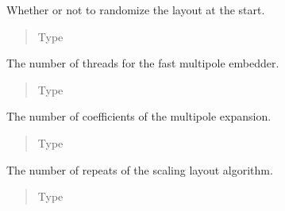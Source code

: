 \documentclass[letterpaper,10pt,english]{sphinxmanual}
\begin{document}
\begin{fulllineitems}
\begin{fulllineitems}
\begin{quote}
\begin{description}
\end{description}\end{quote}

\end{fulllineitems}



\begin{fulllineitems}
Whether or not to randomize the layout at the start.
\begin{quote}\begin{description}
\item[{Type}] \leavevmode
{}

\end{description}\end{quote}

\end{fulllineitems}



\begin{fulllineitems}
The number of threads for the fast multipole embedder.
\begin{quote}\begin{description}
\item[{Type}] \leavevmode
{}

\end{description}\end{quote}

\end{fulllineitems}



\begin{fulllineitems}
The number of coefficients of the multipole expansion.
\begin{quote}\begin{description}
\item[{Type}] \leavevmode
{}

\end{description}\end{quote}

\end{fulllineitems}



\begin{fulllineitems}
The number of repeats of the scaling layout algorithm.
\begin{quote}\begin{description}
\item[{Type}] \leavevmode
{}


\end{description}
\end{quote}
\end{fulllineitems}
\end{fulllineitems}
\end{document}
